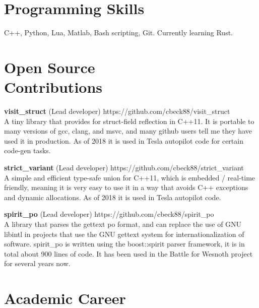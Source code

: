 \documentclass[margin,line]{resume}
\begin{document}
\begin{resume}

    \section{\mysidestyle Programming Skills} 

    C++, Python, Lua, Matlab, Bash scripting, Git. Currently learning Rust.

    \section{\mysidestyle Open Source\\Contributions}

    \textbf{visit\_struct} (Lead developer) \hfill https://github.com/cbeck88/visit\_struct \\
    A tiny library that provides for struct-field reflection in C++11. It is portable to many versions of gcc, clang, and msvc,
    and many github users tell me they have used it in production. As of 2018 it is used in Tesla autopilot code for certain code-gen tasks.

    \textbf{strict\_variant} (Lead developer) \hfill https://github.com/cbeck88/strict\_variant \\
    A simple and efficient type-safe union for C++11, which is embedded / real-time friendly, meaning it is very easy
    to use it in a way that avoids C++ exceptions and dynamic allocations. As of 2018 it is used in Tesla autopilot code.

    \textbf{spirit\_po} (Lead developer) \hfill https://github.com/cbeck88/spirit\_po \\
    A library that parses the gettext po format, and can replace the use of GNU libintl in projects that use the GNU
    gettext system for internationalization of software.
    spirit\_po is written using the boost::spirit parser framework, it is in total about 900 lines of code.
    It has been used in the Battle for Wesnoth project for several years now.


\section{\mysidestyle Academic Career}


\end{resume}
\end{document}
